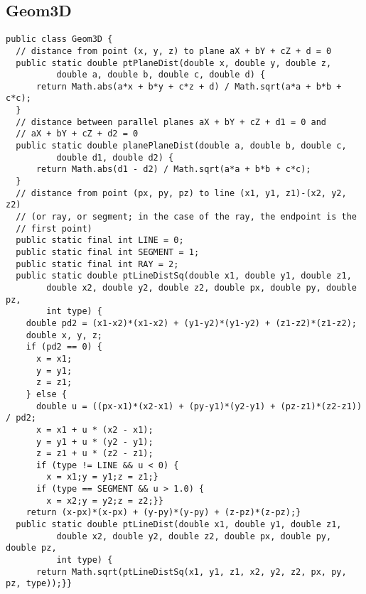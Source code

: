 \documentclass[8pt, oneside]{extarticle}
\begin{document}
\begin{multicols}{3}
\subsection{Geom3D}
\begin{lstlisting}
public class Geom3D {
  // distance from point (x, y, z) to plane aX + bY + cZ + d = 0
  public static double ptPlaneDist(double x, double y, double z,
          double a, double b, double c, double d) {
      return Math.abs(a*x + b*y + c*z + d) / Math.sqrt(a*a + b*b + c*c);
  }
  // distance between parallel planes aX + bY + cZ + d1 = 0 and
  // aX + bY + cZ + d2 = 0
  public static double planePlaneDist(double a, double b, double c,
          double d1, double d2) {
      return Math.abs(d1 - d2) / Math.sqrt(a*a + b*b + c*c);
  }
  // distance from point (px, py, pz) to line (x1, y1, z1)-(x2, y2, z2)
  // (or ray, or segment; in the case of the ray, the endpoint is the
  // first point)
  public static final int LINE = 0;
  public static final int SEGMENT = 1;
  public static final int RAY = 2;
  public static double ptLineDistSq(double x1, double y1, double z1,
        double x2, double y2, double z2, double px, double py, double pz,
        int type) {
    double pd2 = (x1-x2)*(x1-x2) + (y1-y2)*(y1-y2) + (z1-z2)*(z1-z2);
    double x, y, z;
    if (pd2 == 0) {
      x = x1;
      y = y1;
      z = z1;
    } else {
      double u = ((px-x1)*(x2-x1) + (py-y1)*(y2-y1) + (pz-z1)*(z2-z1)) / pd2;
      x = x1 + u * (x2 - x1);
      y = y1 + u * (y2 - y1);
      z = z1 + u * (z2 - z1);
      if (type != LINE && u < 0) {
        x = x1;y = y1;z = z1;}
      if (type == SEGMENT && u > 1.0) {
        x = x2;y = y2;z = z2;}}
    return (x-px)*(x-px) + (y-py)*(y-py) + (z-pz)*(z-pz);}
  public static double ptLineDist(double x1, double y1, double z1,
          double x2, double y2, double z2, double px, double py, double pz,
          int type) {
      return Math.sqrt(ptLineDistSq(x1, y1, z1, x2, y2, z2, px, py, pz, type));}}
\end{lstlisting}

\end{multicols}
\end{document}
